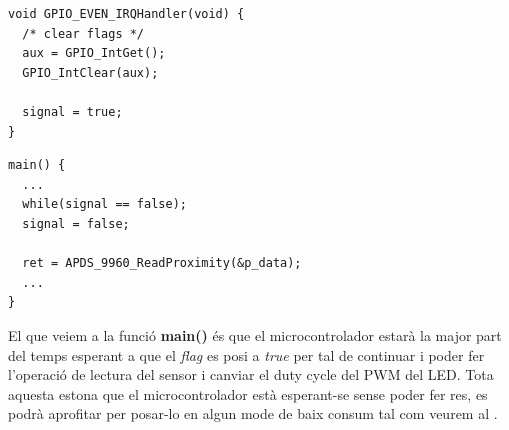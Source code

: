 \begin{lstlisting}[caption={\gls{ISR} amb el {\em flag}},style=customc,label=APDS960ISRFlag]
void GPIO_EVEN_IRQHandler(void) {
  /* clear flags */
  aux = GPIO_IntGet();
  GPIO_IntClear(aux);

  signal = true;
}
\end{lstlisting}
\begin{lstlisting}[caption={Funció principal amb suport d'interrupcions},style=customc,label=APDS960Readmain]
main() {
  ...
  while(signal == false);
  signal = false;

  ret = APDS_9960_ReadProximity(&p_data);
  ...
}
\end{lstlisting}

El que veiem a la funció {\bf main()} és que el microcontrolador estarà la major part del temps esperant a que el {\em flag} es posi a {\em true} per tal de continuar i poder fer l'operació de lectura del sensor i canviar el \gls{duty cycle} del \gls{PWM} del \gls{LED}. Tota aquesta estona que el microcontrolador està esperant-se sense poder fer res, es podrà aprofitar per posar-lo en algun mode de baix consum tal com veurem al .
